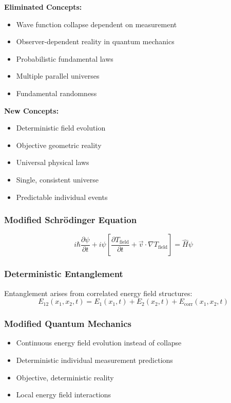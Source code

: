 \documentclass[12pt,a4paper]{article}
\begin{document}
	\textbf{Eliminated Concepts:}
	\begin{itemize}
		\item Wave function collapse dependent on measurement
		\item Observer-dependent reality in quantum mechanics
		\item Probabilistic fundamental laws
		\item Multiple parallel universes
		\item Fundamental randomness
	\end{itemize}
	
	\textbf{New Concepts:}
	\begin{itemize}
		\item Deterministic field evolution
		\item Objective geometric reality
		\item Universal physical laws
		\item Single, consistent universe
		\item Predictable individual events
	\end{itemize}
	
	\subsubsection{Modified Schrödinger Equation}
	
	\begin{equation}
		i\hbar\frac{\partial\psi}{\partial t} + i\psi\left[\frac{\partial T_{\text{field}}}{\partial t} + \vec{v} \cdot \nabla T_{\text{field}}\right] = \hat{H}\psi
	\end{equation}
	
	\subsubsection{Deterministic Entanglement}
	
	Entanglement arises from correlated energy field structures:
	\begin{equation}
		E_{12}(x_1,x_2,t) = E_1(x_1,t) + E_2(x_2,t) + E_{\text{corr}}(x_1,x_2,t)
	\end{equation}
	
	\subsubsection{Modified Quantum Mechanics}
	
	\begin{itemize}
		\item Continuous energy field evolution instead of collapse
		\item Deterministic individual measurement predictions
		\item Objective, deterministic reality
		\item Local energy field interactions
	\end{itemize}
	
\end{document}
